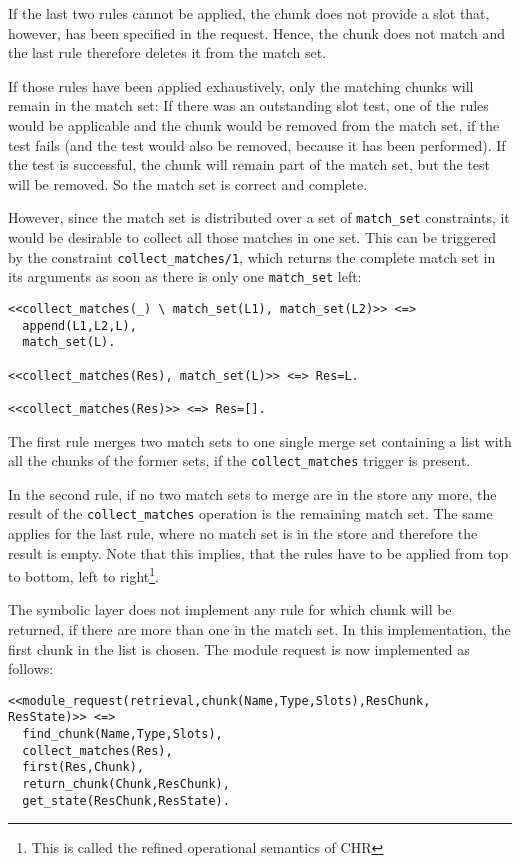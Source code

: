 If the last two rules cannot be applied, the chunk does not provide a slot that, however, has been specified in the request. Hence, the chunk does not match and the last rule therefore deletes it from the match set. 

If those rules have been applied exhaustively, only the matching chunks will remain in the match set: If there was an outstanding slot test, one of the rules would be applicable and the chunk would be removed from the match set, if the test fails (and the test would also be removed, because it has been performed). If the test is successful, the chunk will remain part of the match set, but the test will be removed. So the match set is correct and complete.

However, since the match set is distributed over a set of \lstinline|match_set| constraints, it would be desirable to collect all those matches in one set. This can be triggered by the constraint \lstinline|collect_matches/1|, which returns the complete match set in its arguments as soon as there is only one \lstinline|match_set| left:

\begin{lstlisting}
<<collect_matches(_) \ match_set(L1), match_set(L2)>> <=> 
  append(L1,L2,L), 
  match_set(L).
  
<<collect_matches(Res), match_set(L)>> <=> Res=L.

<<collect_matches(Res)>> <=> Res=[].
\end{lstlisting}

The first rule merges two match sets to one single merge set containing a list with all the chunks of the former sets, if the \lstinline|collect_matches| trigger is present. 

In the second rule, if no two match sets to merge are in the store any more, the result of the \lstinline|collect_matches| operation is the remaining match set. The same applies for the last rule, where no match set is in the store and therefore the result is empty. Note that this implies, that the rules have to be applied from top to bottom, left to right\footnote{This is called the refined operational semantics of CHR}.

The symbolic layer does not implement any rule for which chunk will be returned, if there are more than one in the match set. In this implementation, the first chunk in the list is chosen. The module request is now implemented as follows:

\begin{lstlisting}
<<module_request(retrieval,chunk(Name,Type,Slots),ResChunk, ResState)>> <=> 
  find_chunk(Name,Type,Slots),
  collect_matches(Res),
  first(Res,Chunk),
  return_chunk(Chunk,ResChunk),
  get_state(ResChunk,ResState).
\end{lstlisting}

